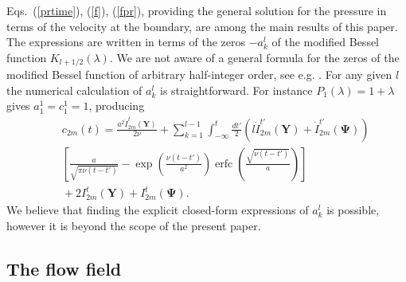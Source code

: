\documentclass[aps,prx,twocolumn,amsmath,amssymb,amsfonts]{revtex4-2}
\DeclareMathOperator\erfc{erfc}
\begin{document}
Eqs.~(\ref{prtime}), (\ref{f}), (\ref{fpr}), providing the general solution for the pressure in terms of the velocity at the boundary, are among the main results of this paper. The expressions are written in terms of the zeros $-a_k^l$ of the modified Bessel function $K_{l+1/2}(\lambda)$. We are not aware of a general formula for the zeros of the modified Bessel function of arbitrary half-integer order, see e.g. \cite{watson}. For any given $l$ the numerical calculation of $a_k^l$ is straightforward. For instance $P_1(\lambda)=1+\lambda$ gives $a_1^1=c_1^1=1$, producing
\begin{eqnarray}&&\!
c_{2m}(t)\!=\!\frac{a^2\dot{I}_{2m}^{t}(\bm Y)}{2\nu}+\sum_{k=1}^{l-1} \int_{-\infty}^{t}\frac{dt'}{2}\left(l \dot{I}_{2m}^{t'}(\bm Y)\!+\!\dot{I}_{2m}^{t'}(\bm \Psi)\right)
\nonumber\\&&\!
\left[\frac{a}{\sqrt{\pi \nu (t-t')}}\!-\!\exp{\left(\frac{\nu (t\!-\!t')}{a^2}\right)}\erfc\left(\frac{\sqrt{\nu (t\!-\!t')}}{a}\right)\right]  \nonumber
\\&&\!+2I_{2m}^{t}(\bm Y)\!+\!I_{2m}^{t}(\bm \Psi).
\end{eqnarray}
We believe that finding the explicit closed-form expressions of $a_k^l$ is possible, however it is beyond the scope of the present paper.



\subsection{The flow field}
\end{document}
